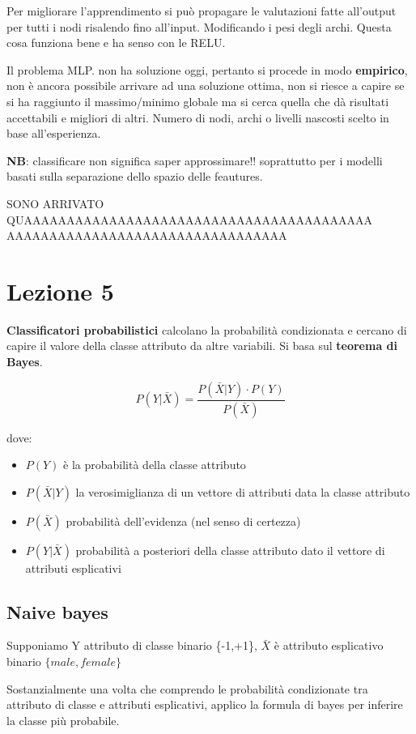 Per migliorare l'apprendimento si pu\`o propagare le valutazioni fatte all'output per tutti i nodi risalendo fino all'input. Modificando i pesi degli archi. Questa cosa funziona bene e ha senso con le RELU.

Il problema MLP. non ha soluzione oggi, pertanto si procede in modo \textbf{empirico}, non \`e ancora possibile arrivare ad una soluzione ottima, non si riesce a capire se si ha raggiunto il massimo/minimo globale ma si cerca quella che dà risultati accettabili e migliori di altri. Numero di nodi, archi o livelli nascosti scelto in base all'esperienza.

\textbf{NB}: classificare non significa saper approssimare!! soprattutto per i modelli basati sulla separazione dello spazio delle feautures.

SONO ARRIVATO QUAAAAAAAAAAAAAAAAAAAAAAAAAAAAAAAAAAAAAAAAA
AAAAAAAAAAAAAAAAAAAAAAAAAAAAAAAAA
\section{Lezione 5}

\textbf{Classificatori probabilistici} calcolano la probabilit\`a condizionata e cercano di capire il valore della classe attributo da altre variabili. Si basa sul \textbf{teorema di Bayes}. 

\[P(Y|\bar{X}) = \frac{P(\bar{X}|Y) \cdot P(Y)}{P(\bar{X})}\]

dove:
\begin{itemize}
	\item $P(Y)$ è la probabilit\`a della classe attributo
	\item $P(\bar{X}|Y)$ la verosimiglianza di un vettore di attributi data la classe attributo
	\item $P(\bar{X})$ probabilit\`a dell'evidenza (nel senso di certezza)
	\item $P(Y|\bar{X})$ probabilit\`a a posteriori della classe attributo dato il vettore di attributi esplicativi
\end{itemize}
\subsection{Naive bayes}
Supponiamo Y attributo di classe binario \{-1,+1\}, $\bar{X}$ \`e attributo esplicativo binario $\{male, female\}$

Sostanzialmente una volta che comprendo le probabilit\`a condizionate tra attributo di classe e attributi esplicativi, applico la formula di bayes per inferire la classe pi\`u probabile. 

